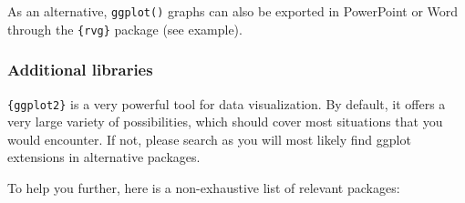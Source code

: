 \documentclass[
]{book}
\begin{document}
As an alternative, \texttt{ggplot()} graphs can also be exported in PowerPoint or Word through the \texttt{\{rvg\}} package (see example).

\hypertarget{additional-libraries}{%
\subsubsection{Additional libraries}\label{additional-libraries}}

\texttt{\{ggplot2\}} is a very powerful tool for data visualization. By default, it offers a very large variety of possibilities, which should cover most situations that you would encounter. If not, please search as you will most likely find ggplot extensions in alternative packages.

To help you further, here is a non-exhaustive list of relevant packages:
\end{document}
